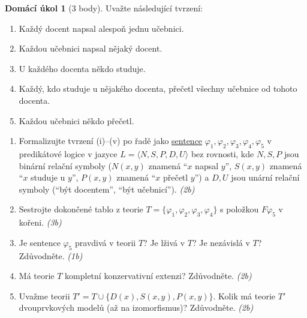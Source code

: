 \documentclass[a4paper]{article}
\theoremstyle{plain}
\theoremstyle{definition}
\newtheorem*{ukol}{Domácí úkol}
\begin{document}
\medskip\begin{ukol}[3 body]
    Uvažte následující tvrzení:
    \begin{enumerate}[label=(\roman*)]\it
        \item Každý docent napsal alespoň jednu učebnici.
        \item Každou učebnici napsal nějaký docent.
        \item U každého docenta někdo studuje.
        \item Každý, kdo studuje u nějakého docenta, přečetl všechny učebnice od tohoto docenta.
        \item Každou učebnici někdo přečetl.
    \end{enumerate}    
    \begin{enumerate}
    \item Formalizujte tvrzení (i)--(v) po řadě jako \underline{sentence} $\varphi_1,\varphi_2,\varphi_3,\varphi_4,\varphi_5$ v predikátové logice v jazyce $L=\langle N, S, P, D, U\rangle$ bez rovnosti, kde $N,S,P$ jsou binární relační symboly ($N(x,y)$ znamená ``$x$ napsal $y$'', $S(x,y)$ znamená ``$x$ studuje u $y$'', $P(x,y)$ znamená ``$x$ přečetl $y$'') a $D,U$ jsou unární relační symboly (``být docentem'', ``být učebnicí''). {\it (2b)}
    \item Sestrojte dokončené tablo z teorie $T=\{\varphi_1,\varphi_2,\varphi_3,\varphi_4\}$ s položkou $F\varphi_5$ v kořeni. {\it (3b)}
    \item Je sentence $\varphi_5$ pravdivá v teorii $T$? Je lživá v $T$? Je nezávislá v $T$? Zdůvodněte. {\it (1b)}
    \item Má teorie $T$ kompletní konzervativní extenzi? Zdůvodněte. {\it (2b)}
    \item Uvažme teorii $T'=T\cup \{D(x),S(x,y),P(x,y)\}$. Kolik má teorie $T'$ dvouprvkových modelů (až na izomorfismus)? Zdůvodněte. {\it (2b)}
    \end{enumerate}
\end{ukol}
\end{document}
